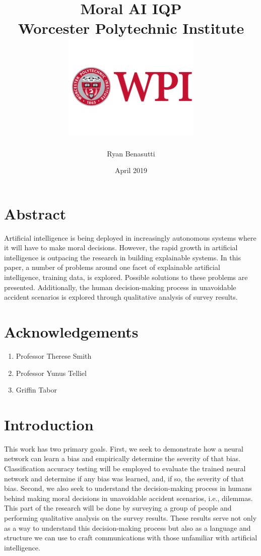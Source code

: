 \documentclass[]{report}
\title{
    {Moral AI IQP}\\
    {\large Worcester Polytechnic Institute}\\
    {\includegraphics[height=2in]{figures/WPI_Inst_Prim_FulClr.png}}
}
\author{Ryan Benasutti}
\date{April 2019}
\begin{document}
\maketitle

\clearpage
\mbox{}
\clearpage

\chapter*{Abstract}

Artificial intelligence is being deployed in increasingly autonomous systems where it will have to
make moral decisions. However, the rapid growth in artificial intelligence is outpacing the research
in building explainable systems. In this paper, a number of problems around one facet of explainable
artificial intelligence, training data, is explored. Possible solutions to these problems are
presented. Additionally, the human decision-making process in unavoidable accident scenarios is
explored through qualitative analysis of survey results.

\chapter*{Acknowledgements}

\begin{enumerate}
    \item Professor Therese Smith
    \item Professor Yunus Telliel
    \item Griffin Tabor
\end{enumerate}

\tableofcontents

\FloatBarrier
\chapter{Introduction}

This work has two primary goals. First, we seek to demonstrate how a neural network can learn a bias
and empirically determine the severity of that bias. Classification accuracy testing will be
employed to evaluate the trained neural network and determine if any bias was learned, and, if so,
the severity of that bias. Second, we also seek to understand the decision-making process in humans
behind making moral decisions in unavoidable accident scenarios, i.e., dilemmas. This part of the
research will be done by surveying a group of people and performing qualitative analysis on the
survey results. These results serve not only as a way to understand this decision-making process but
also as a language and structure we can use to craft communications with those unfamiliar with
artificial intelligence.
\end{document}
